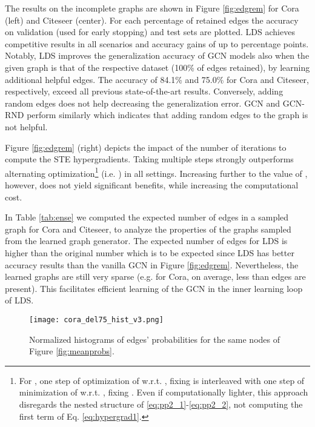 \documentclass{article}
\newcommand{\lds}{\textsc{LDS}\xspace}
\begin{document}
The results on the incomplete graphs are shown in Figure \ref{fig:edgrem}  for Cora (left) and Citeseer (center). For each percentage of retained edges the accuracy on validation (used for early stopping) and test sets are plotted. 
\lds achieves competitive results in all scenarios and accuracy gains of up to  percentage points. 
Notably, \lds improves the generalization accuracy of 
GCN models also when the given graph is that of the respective dataset (100\% of edges retained), by learning additional helpful edges. The accuracy of 84.1\% and 75.0\% for Cora and Citeseer, respectively, exceed all previous state-of-the-art results. Conversely, adding random edges does not help decreasing the generalization error. GCN and GCN-RND perform similarly which indicates that adding random edges to the graph is not helpful. 

Figure \ref{fig:edgrem} (right) depicts the impact of the number of iterations  to compute the STE hypergradients. Taking multiple steps strongly outperforms alternating optimization\footnote{For , one step of optimization of  w.r.t. , fixing 
is interleaved with one step of minimization of  w.r.t. , fixing . 
Even if computationally lighter, this approach disregards the nested structure of \eqref{eq:pp2_1}-\eqref{eq:pp2_2}, not computing the first term of Eq. \eqref{eq:hypergrad1}.}
(i.e. ) in all settings. 
Increasing  further to the value of , however, does not yield significant benefits, while increasing the computational cost.

In Table \ref{tab:ense} we computed the expected number of edges in a sampled graph for Cora and Citeseer, to analyze the properties of the graphs sampled from the learned graph generator. The expected number of edges for \lds is higher than the original number which is to be expected since \lds has better accuracy results than the vanilla GCN in Figure \ref{fig:edgrem}. 
Nevertheless, the learned graphs are still very  sparse (e.g. for Cora, on average, less than  edges are present). This facilitates efficient learning of the GCN 
in the inner learning loop of \lds. 

\begin{figure}[t!]
    \begin{center}
    \texttt{[image: cora\_del75\_hist\_v3.png]}
    \end{center}
    \vspace{-4mm}
    \caption{Normalized histograms of edges' probabilities for the same nodes of Figure \ref{fig:meanprobs}.
}
    \label{fig:histo}
    \vspace{-6mm}
\end{figure}
\end{document}
